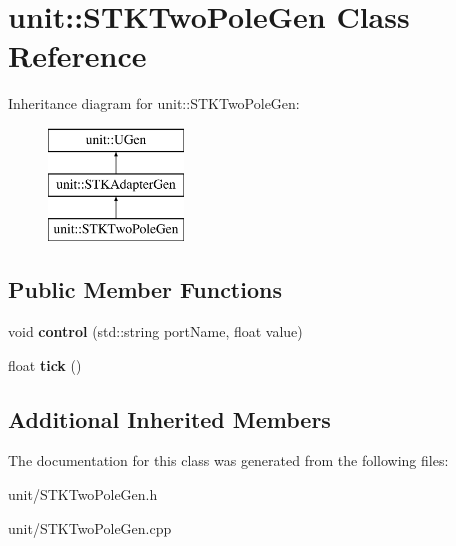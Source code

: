 \hypertarget{classunit_1_1STKTwoPoleGen}{}\section{unit\+:\+:S\+T\+K\+Two\+Pole\+Gen Class Reference}
\label{classunit_1_1STKTwoPoleGen}
Inheritance diagram for unit\+:\+:S\+T\+K\+Two\+Pole\+Gen\+:\begin{figure}[H]
\begin{center}
\leavevmode
\includegraphics[height=3.000000cm]{classunit_1_1STKTwoPoleGen}
\end{center}
\end{figure}
\subsection*{Public Member Functions}
\begin{DoxyCompactItemize}
\item 
void {\bfseries control} (std\+::string port\+Name, float value)\hypertarget{classunit_1_1STKTwoPoleGen_a71b904b3c03c69f5fb25bbf2449fb802}{}\label{classunit_1_1STKTwoPoleGen_a71b904b3c03c69f5fb25bbf2449fb802}

\item 
float {\bfseries tick} ()\hypertarget{classunit_1_1STKTwoPoleGen_ade033932ab7e85b7f3d6a69461eef372}{}\label{classunit_1_1STKTwoPoleGen_ade033932ab7e85b7f3d6a69461eef372}

\end{DoxyCompactItemize}
\subsection*{Additional Inherited Members}


The documentation for this class was generated from the following files\+:\begin{DoxyCompactItemize}
\item 
unit/S\+T\+K\+Two\+Pole\+Gen.\+h\item 
unit/S\+T\+K\+Two\+Pole\+Gen.\+cpp\end{DoxyCompactItemize}
